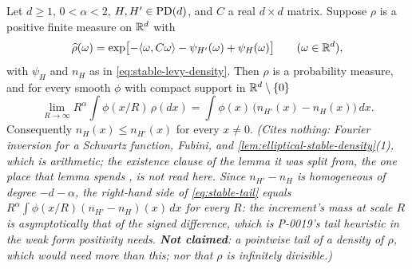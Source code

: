 \begin{lemma}
\label{lem:stable-tail}
\leanok
Let $d \ge 1$, $0 < \alpha < 2$, $H, H' \in \mathrm{PD}(d)$, and $C$ a real $d \times d$ matrix.
Suppose $\rho$ is a positive finite measure on $\mathbb{R}^d$ with
\begin{equation}\label{eq:stable-tail-transform}
  \widehat\rho(\omega) = \exp\bigl[-\langle\omega,C\omega\rangle - \psi_{H'}(\omega) + \psi_H(\omega)\bigr]
  \qquad (\omega \in \mathbb{R}^d),
\end{equation}
with $\psi_H$ and $n_H$ as in \ref{eq:stable-levy-density}. Then $\rho$ is a probability measure,
and for every smooth $\phi$ with compact support in $\mathbb{R}^d \setminus \{0\}$
\begin{equation}\label{eq:stable-tail}
  \lim_{R\to\infty} R^\alpha\int\phi(x/R)\,\rho(dx) = \int\phi(x)\,\bigl(n_{H'}(x) - n_H(x)\bigr)\,dx .
\end{equation}
Consequently $n_H(x) \le n_{H'}(x)$ for every $x \ne 0$.
\statusT\quad\emph{(Cites nothing: Fourier inversion for a Schwartz function, Fubini, and
\ref{lem:elliptical-stable-density}(1), which is arithmetic; the existence clause of the lemma it was
split from, the one place that lemma spends , is not read here. Since $n_{H'} - n_H$ is homogeneous of degree $-d-\alpha$,
the right-hand side of \ref{eq:stable-tail} equals $R^\alpha\int\phi(x/R)(n_{H'} - n_H)(x)\,dx$
for every $R$: the increment's mass at scale $R$ is asymptotically that of the signed \Levy{}
difference, which is P-0019's tail heuristic in the weak form positivity needs. \textbf{Not
claimed}: a pointwise tail of a density of $\rho$, which would need more than this; nor that $\rho$ is
infinitely divisible.)}
\end{lemma}

